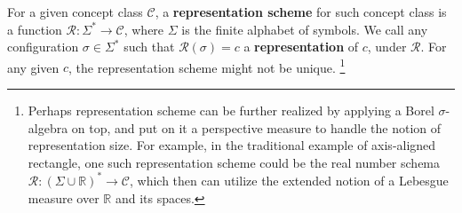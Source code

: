 \documentclass[10pt]{article} %
\begin{document}
\begin{definition}
    For a given concept class $\mathcal{C}$, a \textbf{representation scheme} for such concept class is a function $\mathcal{R}: \Sigma^{*}\to \mathcal{C}$, where $\Sigma$ is the finite alphabet of symbols. We call any configuration $\sigma \in \Sigma^{*}$ such that $\mathcal{R}(\sigma)=c$ a \textbf{representation} of $c$, under $\mathcal{R}$. For any given $c$, the representation scheme might not be unique. \footnote{Perhaps representation scheme can be further realized by applying a Borel $\sigma$-algebra on top, and put on it a perspective measure to handle the notion of representation size. For example, in the traditional example of axis-aligned rectangle, one such representation scheme could be the real number schema $\mathcal{R}:(\Sigma \cup \mathbb{R})^{*}\to \mathcal{C}$, which then can utilize the extended notion of a Lebesgue measure over $\mathbb{R}$ and its spaces.}
\end{definition} 
\end{document}
